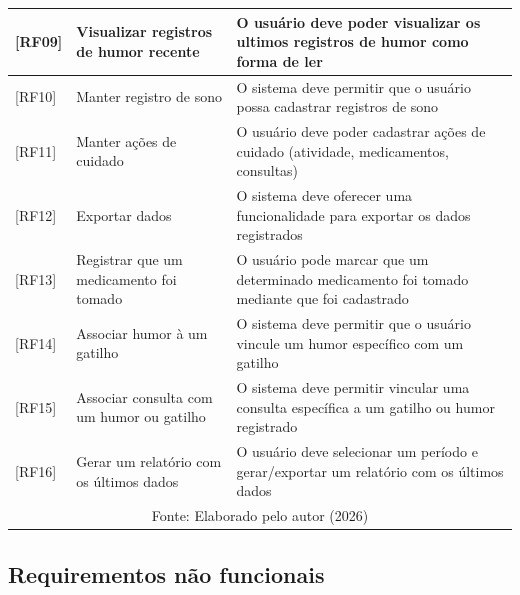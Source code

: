 \begin{longtable}{| p{} | p{} | p{} |}
        \hline

        [RF09] &
        Visualizar registros de humor recente &
        O usuário deve poder visualizar os ultimos registros de humor como
        forma de ler \\

        \hline

        [RF10] &
        Manter registro de sono &
        O sistema deve permitir que o usuário possa cadastrar registros de sono \\

        \hline

        [RF11] &
        Manter ações de cuidado &
        O usuário deve poder cadastrar ações de cuidado (atividade, medicamentos, consultas) \\

        \hline

        [RF12] &
        Exportar dados &
        O sistema deve oferecer uma funcionalidade para exportar os dados
        registrados \\

        \hline

        [RF13] &
        Registrar que um medicamento foi tomado &
        O usuário pode marcar que um determinado medicamento foi tomado
        mediante que foi cadastrado \\

        \hline

        [RF14] &
        Associar humor à um gatilho &
        O sistema deve permitir que o usuário vincule um humor específico com
        um gatilho \\

        \hline

        [RF15] &
        Associar consulta com um humor ou gatilho &
        O sistema deve permitir vincular uma consulta específica a um
        gatilho ou humor registrado \\

        \hline

        [RF16] &
        Gerar um relatório com os últimos dados &
        O usuário deve selecionar um período e gerar/exportar um relatório com
        os últimos dados  \\

        \hline
        \multicolumn{3}{c}{\small Fonte: Elaborado pelo autor (2026)} \\
\end{longtable}

\subsection{Requirementos não funcionais}

